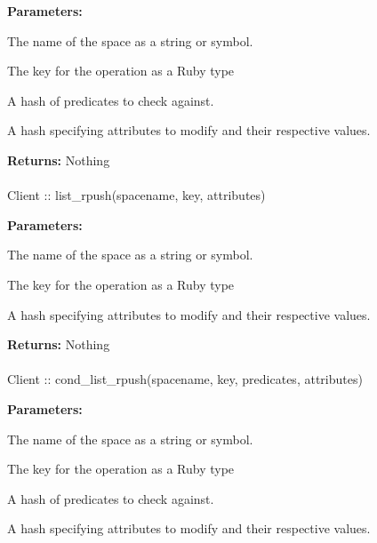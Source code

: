 \noindent\textbf{Parameters:}
\begin{description}[labelindent=\widthof{{predicates}},leftmargin=*,noitemsep,nolistsep,align=right]
\item[spacename] The name of the space as a string or symbol.
\item[key] The key for the operation as a Ruby type
\item[predicates] A hash of predicates to check against.
\item[attributes] A hash specifying attributes to modify and their respective values.
\end{description}

\noindent\textbf{Returns:}
Nothing

\paragraph{}
\begin{ccode}
Client :: list_rpush(spacename, key, attributes)
\end{ccode}
\funcdesc 

\noindent\textbf{Parameters:}
\begin{description}[labelindent=\widthof{{attributes}},leftmargin=*,noitemsep,nolistsep,align=right]
\item[spacename] The name of the space as a string or symbol.
\item[key] The key for the operation as a Ruby type
\item[attributes] A hash specifying attributes to modify and their respective values.
\end{description}

\noindent\textbf{Returns:}
Nothing

\paragraph{}
\begin{ccode}
Client :: cond_list_rpush(spacename, key, predicates, attributes)
\end{ccode}
\funcdesc 

\noindent\textbf{Parameters:}
\begin{description}[labelindent=\widthof{{predicates}},leftmargin=*,noitemsep,nolistsep,align=right]
\item[spacename] The name of the space as a string or symbol.
\item[key] The key for the operation as a Ruby type
\item[predicates] A hash of predicates to check against.
\item[attributes] A hash specifying attributes to modify and their respective values.
\end{description}

